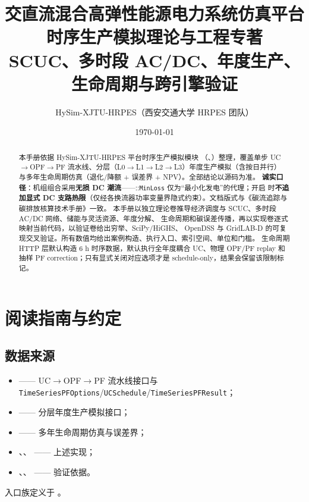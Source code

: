 \documentclass[UTF8,fontset=fandol,a4paper,11pt]{ctexart}
\title{\textbf{交直流混合高弹性能源电力系统仿真平台}\\[0.5em]
       {\Large 时序生产模拟理论与工程专著}\\[0.3em]
       {\large SCUC、多时段 AC/DC、年度生产、生命周期与跨引擎验证}}
\author{HySim-XJTU-HRPES（西安交通大学 HRPES 团队）}
\date{\today}
\begin{document}
\maketitle
\begin{abstract}
\noindent 本手册依据 HySim-XJTU-HRPES 平台时序生产模拟模块
（、）整理，覆盖单步
UC$\to$OPF$\to$PF 流水线、分层（L0$\to$L1$\to$L2$\to$L3）年度生产模拟（含按日并行）
与多年生命周期仿真（退化/降额 + 误差界 + NPV）。全部结论以源码为准。
\textbf{诚实口径}：机组组合采用\textbf{无损 DC 潮流}——::\texttt{MinLoss}
仅为“最小化发电”的代理；开启  时\textbf{不追加显式
DC 支路热限}（仅经各换流器功率变量界隐式约束）。文档版式与《碳流追踪与碳排放核算技术手册》一致。
本手册以独立理论卷推导经济调度与 SCUC、多时段 AC/DC 网络、储能与灵活资源、年度分解、
生命周期和碳误差传播，再以实现卷逐式映射当前代码，以验证卷给出穷举、SciPy/HiGHS、
OpenDSS 与 GridLAB-D 的可复现交叉验证。所有数值均给出案例构造、执行入口、索引空间、单位和门槛。
生命周期 HTTP 层默认构造 6 h 时序数据，默认执行全年度耦合 UC、物理 OPF/PF replay
和抽样 PF correction；只有显式关闭对应选项才是 schedule-only，结果会保留该限制标记。
\end{abstract}

\tableofcontents
\newpage

\section{阅读指南与约定}
\subsection{数据来源}
\begin{itemize}
  \item {} —— UC$\to$OPF$\to$PF 流水线接口与
        \texttt{TimeSeriesPFOptions}/\texttt{UCSchedule}/\texttt{TimeSeriesPFResult}；
  \item {} —— 分层年度生产模拟接口；
  \item {} —— 多年生命周期仿真与误差界；
  \item {}、、
         —— 上述实现；
  \item {}、、
         —— 验证依据。
\end{itemize}
入口族定义于 。
\end{document}
